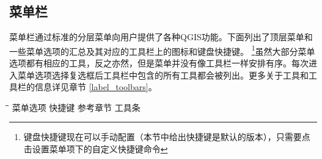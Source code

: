 
\subsection{菜单栏}\label{label_menubar}

菜单栏通过标准的分层菜单向用户提供了各种QGIS功能。下面列出了顶层菜单和一些菜单选项的汇总及其对应的工具栏上的图标和键盘快捷键。 \footnote{键盘快捷键现在可以手动配置（本节中给出快捷键是默认的版本），只需要点击设置菜单项下的自定义快捷键命令}虽然大部分菜单选项都有相应的工具，反之亦然，但是菜单并没有像工具栏一样安排有序。每次进入菜单选项选择复选框后工具栏中包含的所有工具都会被列出。更多关于工具和工具栏的信息详见章节 \ref{label_toolbars}。

\begin{tabbing}
\hspace{5.5cm}\=\hspace{3cm}\=\hspace{3.5cm}\= \kill
\hspace{1cm} 菜单选项 \> 快捷键 \> 参考章节 \> 工具条\\
\end{tabbing}

